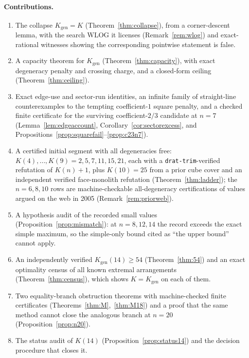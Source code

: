 \documentclass[11pt]{article}
\theoremstyle{definition}
\newcommand{\Kgen}{K_{\mathrm{gen}}}
\begin{document}
\paragraph{Contributions.}
\begin{enumerate}
\item The collapse $\Kgen=K$ (Theorem~\ref{thm:collapse}), from a
corner-descent lemma, with the search WLOG it licenses
(Remark~\ref{rem:wlog}) and exact-rational witnesses showing the
corresponding pointwise statement is false.
\item A capacity theorem for $\Kgen$ (Theorem~\ref{thm:capacity}), with exact
degeneracy penalty and crossing charge, and a closed-form ceiling
(Theorem~\ref{thm:ceiling}).
\item Exact edge-use and sector-run identities, an infinite family of
straight-line counterexamples to the tempting coefficient-$1$ square penalty,
and a checked finite certificate for the surviving coefficient-$2/3$
candidate at $n=7$ (Lemma~\ref{lem:edgeaccount},
Corollary~\ref{cor:sectorexcess}, and
Propositions~\ref{prop:squarefail}--\ref{prop:c23n7}).
\item A certified initial segment with all degeneracies free:
$K(4),\dots,K(9)=2,5,7,11,15,21$, each with a \texttt{drat-trim}-verified
refutation of $K(n)+1$, plus $K(10)=25$ from a prior cube cover and an
independent verified face-monolith refutation
(Theorem~\ref{thm:ladder}); the $n=6,8,10$ rows are machine-checkable
all-degeneracy certifications of values argued on the web in 2005
(Remark~\ref{rem:priorweb}).
\item A hypothesis audit of the recorded small values
(Proposition~\ref{prop:mismatch}): at $n=8,12,14$ the record exceeds the
exact simple maximum, so the simple-only bound cited as ``the upper bound''
cannot apply.
\item An independently verified $\Kgen(14)\ge54$ (Theorem~\ref{thm:54}) and
an exact optimality census of all known extremal arrangements
(Theorem~\ref{thm:census}), which shows $K=\Kgen$ on each of them.
\item Two equality-branch obstruction theorems with machine-checked finite
certificates (Theorems~\ref{thm:M},~\ref{thm:M18}) and a proof that the same
method cannot close the analogous branch at $n=20$
(Proposition~\ref{prop:n20}).
\item The status audit of $K(14)$ (Proposition~\ref{prop:status14}) and the
decision procedure that closes it.
\end{enumerate}
\end{document}
